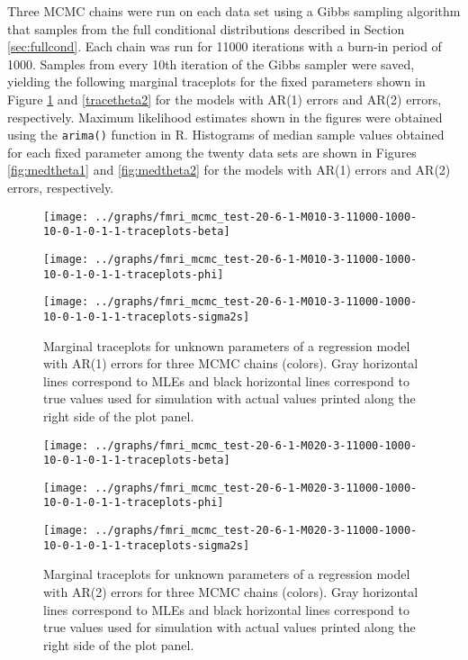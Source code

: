 \documentclass{article}
\begin{document}
Three MCMC chains were run on each data set using a Gibbs sampling algorithm that samples from the full conditional distributions described in Section \ref{sec:fullcond}. Each chain was run for 11000 iterations with a burn-in period of 1000. Samples from every 10th iteration of the Gibbs sampler were saved, yielding the following marginal traceplots for the fixed parameters shown in Figure \ref{fig:tracetheta1} and \ref{tracetheta2} for the models with AR(1) errors and AR(2) errors, respectively. Maximum likelihood estimates shown in the figures were obtained using the {\tt arima()} function in R. Histograms of median sample values obtained for each fixed parameter among the twenty data sets are shown in Figures \ref{fig:medtheta1} and \ref{fig:medtheta2} for the models with AR(1) errors and AR(2) errors, respectively.

\begin{figure}[ht]
\begin{minipage}{0.5\linewidth}
\texttt{[image: ../graphs/fmri\_mcmc\_test-20-6-1-M010-3-11000-1000-10-0-1-0-1-1-traceplots-beta]}
\end{minipage}
\begin{minipage}{0.5\linewidth}
\texttt{[image: ../graphs/fmri\_mcmc\_test-20-6-1-M010-3-11000-1000-10-0-1-0-1-1-traceplots-phi]}
\end{minipage}
\begin{minipage}{0.5\linewidth}
\texttt{[image: ../graphs/fmri\_mcmc\_test-20-6-1-M010-3-11000-1000-10-0-1-0-1-1-traceplots-sigma2s]}
\end{minipage}
\caption{Marginal traceplots for unknown parameters of a regression model with AR(1) errors for three MCMC chains (colors). Gray horizontal lines correspond to MLEs and black horizontal lines correspond to true values used for simulation with actual values printed along the right side of the plot panel.} \label{fig:tracetheta1}
\end{figure}

\begin{figure}[ht]
\begin{minipage}{0.5\linewidth}
\texttt{[image: ../graphs/fmri\_mcmc\_test-20-6-1-M020-3-11000-1000-10-0-1-0-1-1-traceplots-beta]}
\end{minipage}
\begin{minipage}{0.5\linewidth}
\texttt{[image: ../graphs/fmri\_mcmc\_test-20-6-1-M020-3-11000-1000-10-0-1-0-1-1-traceplots-phi]}
\end{minipage}
\begin{minipage}{0.5\linewidth}
\texttt{[image: ../graphs/fmri\_mcmc\_test-20-6-1-M020-3-11000-1000-10-0-1-0-1-1-traceplots-sigma2s]}
\end{minipage}
\caption{Marginal traceplots for unknown parameters of a regression model with AR(2) errors for three MCMC chains (colors). Gray horizontal lines correspond to MLEs and black horizontal lines correspond to true values used for simulation with actual values printed along the right side of the plot panel.} \label{fig:tracetheta2}
\end{figure}
\end{document}
